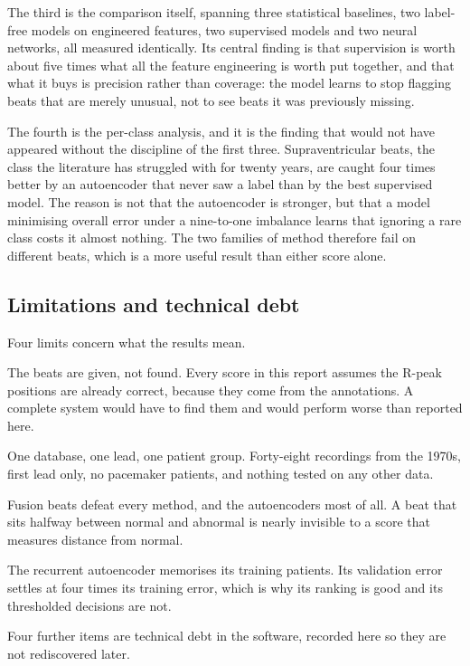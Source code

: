 \documentclass[a4paper, 12pt]{article}
\begin{document}
The third is the comparison itself, spanning three statistical baselines, two
label-free models on engineered features, two supervised models and two neural
networks, all measured identically. Its central finding is that supervision is
worth about five times what all the feature engineering is worth put together, and
that what it buys is precision rather than coverage: the model learns to stop
flagging beats that are merely unusual, not to see beats it was previously missing.

The fourth is the per-class analysis, and it is the finding that would not have
appeared without the discipline of the first three. Supraventricular beats, the
class the literature has struggled with for twenty years, are caught four times
better by an autoencoder that never saw a label than by the best supervised model.
The reason is not that the autoencoder is stronger, but that a model minimising
overall error under a nine-to-one imbalance learns that ignoring a rare class costs
it almost nothing. The two families of method therefore fail on different beats,
which is a more useful result than either score alone.

\subsection{Limitations and technical debt} \label{subsec:debt}

Four limits concern what the results mean.

The beats are given, not found. Every score in this report assumes the R-peak
positions are already correct, because they come from the annotations. A complete
system would have to find them and would perform worse than reported here.

One database, one lead, one patient group. Forty-eight recordings from the 1970s,
first lead only, no pacemaker patients, and nothing tested on any other data.

Fusion beats defeat every method, and the autoencoders most of all. A beat that
sits halfway between normal and abnormal is nearly invisible to a score that
measures distance from normal.

The recurrent autoencoder memorises its training patients. Its validation error
settles at four times its training error, which is why its ranking is good and its
thresholded decisions are not.

Four further items are technical debt in the software, recorded here so they are
not rediscovered later.
\end{document}
